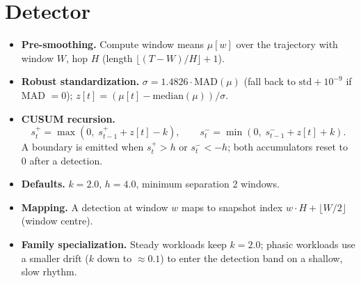 \documentclass[conference]{IEEEtran}
\begin{document}
\section{Detector}
\begin{itemize}
  \item \textbf{Pre-smoothing.} Compute window means
        $\mu[w]$ over the trajectory with window $W$, hop $H$ (length
        $\lfloor (T-W)/H \rfloor + 1$).
  \item \textbf{Robust standardization.} $\sigma = 1.4826 \cdot \mathrm{MAD}(\mu)$
        (fall back to $\mathrm{std}+10^{-9}$ if MAD $=0$);
        $z[t] = (\mu[t] - \mathrm{median}(\mu))/\sigma$.
  \item \textbf{CUSUM recursion.}
        \[
          s^{+}_t = \max(0,\; s^{+}_{t-1} + z[t] - k), \qquad
          s^{-}_t = \min(0,\; s^{-}_{t-1} + z[t] + k).
        \]
        A boundary is emitted when $s^{+}_t > h$ or $s^{-}_t < -h$; both
        accumulators reset to 0 after a detection.
  \item \textbf{Defaults.} $k = 2.0$, $h = 4.0$, minimum separation 2 windows.
  \item \textbf{Mapping.} A detection at window $w$ maps to snapshot index
        $w \cdot H + \lfloor W/2 \rfloor$ (window centre).
  \item \textbf{Family specialization.} Steady workloads keep $k=2.0$; phasic
        workloads use a smaller drift ($k$ down to $\approx 0.1$) to enter the
        detection band on a shallow, slow rhythm.
\end{itemize}
\end{document}
